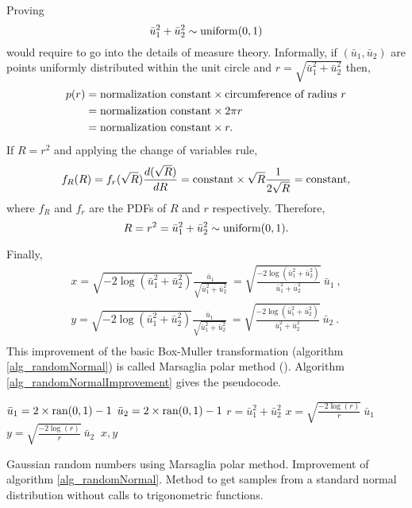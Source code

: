 \begin{remark}
Proving 
$$
  \bar{u}_1^2 + \bar{u}_2^2 \sim \textup{uniform}(0,1)
$$ 
would require to go into the details of measure theory. Informally, if $(\bar{u}_1, \bar{u}_2)$ are points uniformly distributed within the unit circle and $r=\sqrt{\bar{u}_1^2 + \bar{u}_2^2}$ then,
$$
 \begin{aligned}
  p(r) &= \textup{normalization constant} \times \textup{circumference of radius $r$} \\
    &= \textup{normalization constant} \times 2\pi r \\
    &= \textup{normalization constant} \times r. \\
 \end{aligned}
$$
If $R = r^2$ and applying the change of variables rule,
$$
  f_{R}(R) = f_r(\sqrt{R}) \frac{d(\sqrt{R})}{dR} 
    = \textup{constant} \times \sqrt{R}\frac{1}{2\sqrt{R}} = \textup{constant},
$$
where $f_{R}$ and $f_r$ are the PDFs of $R$ and $r$ respectively.
Therefore,
$$
  R = r^2 = \bar{u}_1^2 + \bar{u}_2^2 \sim \textup{uniform}(0,1).
$$
\end{remark}
Finally,
$$
  \begin{array}{c}
    x = \sqrt{-2\log(\bar{u}_1^2 + \bar{u}_2^2)} \frac{\bar{u}_1}{\sqrt{\bar{u}_1^2 + \bar{u}_2^2}} \ = \sqrt{\frac{-2\log(\bar{u}_1^2 + \bar{u}_2^2)}{\bar{u}_1^2 + \bar{u}_2^2}} \ \bar{u}_1 \ , \\
    y = \sqrt{-2\log(\bar{u}_1^2 + \bar{u}_2^2)} \frac{\bar{u}_1}{\sqrt{\bar{u}_1^2 + \bar{u}_2^2}} \ = \sqrt{\frac{-2\log(\bar{u}_1^2 + \bar{u}_2^2)}{\bar{u}_1^2 + \bar{u}_2^2}} \ \bar{u}_2 \ . \\
  \end{array}
$$
This improvement of the basic Box-Muller transformation (algorithm \ref{alg_randomNormal}) is called Marsaglia polar method (\cite{marsaglia1964}). Algorithm \ref{alg_randomNormalImprovement} gives the pseudocode.

\vspace{5mm}
\begin{algorithm}[H]
\SetAlgoLined
  {
    $\bar{u}_1 = 2 \times \textup{ran}(0,1) - 1$\;
    $\bar{u}_2 = 2 \times \textup{ran}(0,1) - 1$\;
    $r = \bar{u}_1^2 + \bar{u}_2^2$\;
  }
  $x = \sqrt{\frac{-2\log(r)}{r}} \ \bar{u}_1 \ $\;
  $y = \sqrt{\frac{-2\log(r)}{r}} \ \bar{u}_2 \ $\;
   ${x,y}$\;
\caption[Gaussian random numbers using Marsaglia polar method]
{
  Gaussian random numbers using Marsaglia polar method. Improvement of algorithm \ref{alg_randomNormal}. Method to get samples from a standard normal distribution without calls to trigonometric functions.
}
\label{alg_randomNormalImprovement}
\end{algorithm}
\vspace{5mm}

